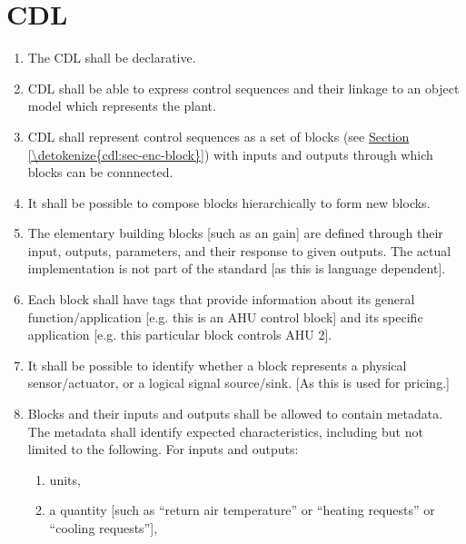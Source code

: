 \documentclass[letterpaper,10pt, openany,english]{sphinxmanual}
\begin{document}
\section{CDL}
\label{\detokenize{requirements:cdl}}\begin{enumerate}
\def\theenumi{\arabic{enumi}}
\def\labelenumi{\theenumi .}
\makeatletter\def\p@enumii{\p@enumi \theenumi .}\makeatother
\item {} 
The CDL shall be declarative.

\item {} 
CDL shall be able to express control sequences and their linkage to an object model which represents the plant.

\item {} 
CDL shall represent control sequences as a set of blocks (see \hyperref[\detokenize{cdl:sec-enc-block}]{Section \ref{\detokenize{cdl:sec-enc-block}}}) with inputs and outputs
through which blocks can be connnected.

\item {} 
It shall be possible to compose blocks hierarchically to form new blocks.

\item {} 
The elementary building blocks {[}such as an gain{]} are defined through their input, outputs, parameters, and their response to given outputs.
The actual implementation is not part of the standard {[}as this is language dependent{]}.

\item {} 
Each block shall have tags that provide information about its general function/application {[}e.g. this is an AHU control block{]} and its specific application {[}e.g. this particular block controls AHU 2{]}.

\item {} 
It shall be possible to identify whether a block represents a physical sensor/actuator, or a logical signal source/sink. {[}As this is used for pricing.{]}

\item {} 
Blocks and their inputs and outputs shall be allowed to contain metadata.
The metadata shall identify expected characteristics, including but not limited to the following.
For inputs and outputs:
\begin{enumerate}
\def\theenumii{\arabic{enumii}}
\def\labelenumii{\theenumii .}
\makeatletter\def\p@enumiii{\p@enumii \theenumii .}\makeatother
\item {} 
units,

\item {} 
a quantity {[}such as “return air temperature” or “heating requests” or “cooling requests”{]},


\end{enumerate}
\end{enumerate}
\end{document}

